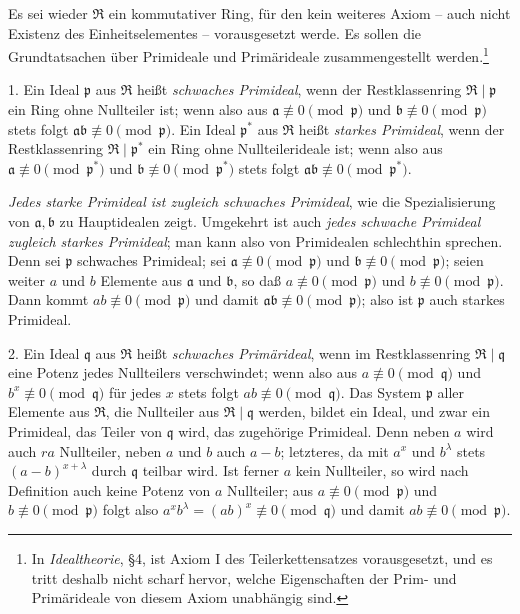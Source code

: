 \documentclass[11pt]{article}
\providecommand{\mR}{\mathfrak{R}}
\providecommand{\ma}{\mathfrak{a}}
\providecommand{\mb}{\mathfrak{b}}
\providecommand{\mpideal}{\mathfrak{p}}
\providecommand{\mq}{\mathfrak{q}}
\begin{document}
Es sei wieder $\mR$ ein kommutativer Ring, für den kein weiteres Axiom -- auch nicht Existenz des Einheitselementes -- vorausgesetzt werde. Es sollen die Grundtatsachen über Primideale und Primärideale zusammengestellt werden.\footnote{In \emph{Idealtheorie}, §4, ist Axiom I des Teilerkettensatzes vorausgesetzt, und es tritt deshalb nicht scharf hervor, welche Eigenschaften der Prim- und Primärideale von diesem Axiom unabhängig sind.}

1. Ein Ideal $\mpideal$ aus $\mR$ heißt \emph{schwaches Primideal}, wenn der Restklassenring $\mR\mid\mpideal$ ein Ring ohne Nullteiler ist; wenn also aus $\ma\not\equiv0\pmod{\mpideal}$ und $\mb\not\equiv0\pmod{\mpideal}$ stets folgt $\ma\mb\not\equiv0\pmod{\mpideal}$. Ein Ideal $\mpideal^*$ aus $\mR$ heißt \emph{starkes Primideal}, wenn der Restklassenring $\mR\mid\mpideal^*$ ein Ring ohne Nullteilerideale ist; wenn also aus $\ma\not\equiv0\pmod{\mpideal^*}$ und $\mb\not\equiv0\pmod{\mpideal^*}$ stets folgt $\ma\mb\not\equiv0\pmod{\mpideal^*}$.

\emph{Jedes starke Primideal ist zugleich schwaches Primideal}, wie die Spezialisierung von $\ma,\mb$ zu Hauptidealen zeigt. Umgekehrt ist auch \emph{jedes schwache Primideal zugleich starkes Primideal}; man kann also von Primidealen schlechthin sprechen. Denn sei $\mpideal$ schwaches Primideal; sei $\ma\not\equiv0\pmod{\mpideal}$ und $\mb\not\equiv0\pmod{\mpideal}$; seien weiter $a$ und $b$ Elemente aus $\ma$ und $\mb$, so daß $a\not\equiv0\pmod{\mpideal}$ und $b\not\equiv0\pmod{\mpideal}$. Dann kommt $ab\not\equiv0\pmod{\mpideal}$ und damit $\ma\mb\not\equiv0\pmod{\mpideal}$; also ist $\mpideal$ auch starkes Primideal.

2. Ein Ideal $\mq$ aus $\mR$ heißt \emph{schwaches Primärideal}, wenn im Restklassenring $\mR\mid\mq$ eine Potenz jedes Nullteilers verschwindet; wenn also aus $a\not\equiv0\pmod{\mq}$ und $b^x\not\equiv0\pmod{\mq}$ für jedes $x$ stets folgt $ab\not\equiv0\pmod{\mq}$. Das System $\mpideal$ aller Elemente aus $\mR$, die Nullteiler aus $\mR\mid\mq$ werden, bildet ein Ideal, und zwar ein Primideal, das Teiler von $\mq$ wird, das zugehörige Primideal. Denn neben $a$ wird auch $ra$ Nullteiler, neben $a$ und $b$ auch $a-b$; letzteres, da mit $a^x$ und $b^\lambda$ stets $(a-b)^{x+\lambda}$ durch $\mq$ teilbar wird. Ist ferner $a$ kein Nullteiler, so wird nach Definition auch keine Potenz von $a$ Nullteiler; aus $a\not\equiv0\pmod{\mpideal}$ und $b\not\equiv0\pmod{\mpideal}$ folgt also $a^x b^\lambda=(ab)^x\not\equiv0\pmod{\mq}$ und damit $ab\not\equiv0\pmod{\mpideal}$.
\end{document}
